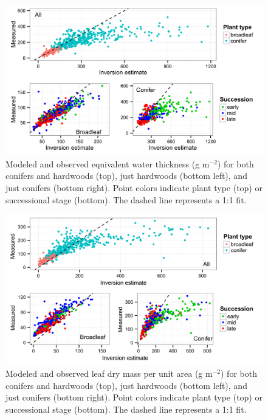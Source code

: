 \begin{figure}
  \centering
  \includegraphics[width=\textwidth]{2_rtm_inversion/figures/ewt_validation.png}
  \caption{%
    Modeled and observed equivalent water thickness (g m$^{-2}$) for both conifers and hardwoods (top), just hardwoods (bottom left), and just conifers (bottom right).
    Point colors indicate plant type (top) or successional stage (bottom).
    The dashed line represents a 1:1 fit.
  }\label{fig:pecanrtm-ewt}
\end{figure}

\begin{figure}
  \centering
  \includegraphics[width=\textwidth]{2_rtm_inversion/figures/lma_validation.png}
  \caption{%
    Modeled and observed leaf dry mass per unit area (g m$^{-2}$) for both conifers and hardwoods (top), just hardwoods (bottom left), and just conifers (bottom right).
    Point colors indicate plant type (top) or successional stage (bottom).
    The dashed line represents a 1:1 fit.
  }\label{fig:pecanrtm-lma}
\end{figure}

